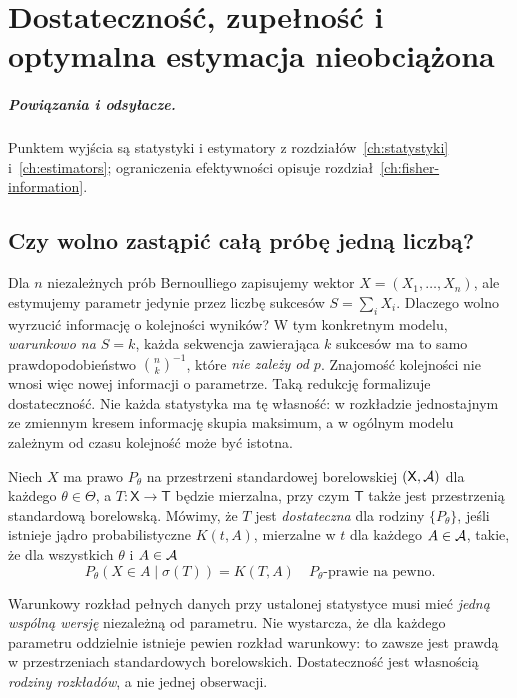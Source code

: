 \chapter{Dostateczność, zupełność i optymalna estymacja nieobciążona}
\label{ch:sufficiency}
\paragraph{Powiązania i odsyłacze.} Punktem wyjścia są statystyki i estymatory z rozdziałów~\ref{ch:statystyki} i~\ref{ch:estimators}; ograniczenia efektywności opisuje rozdział~\ref{ch:fisher-information}.


\section{Czy wolno zastąpić całą próbę jedną liczbą?}
Dla $n$ niezależnych prób Bernoulliego zapisujemy wektor
$X=(X_1,\ldots,X_n)$, ale estymujemy parametr jedynie przez
liczbę sukcesów $S=\sum_i X_i$. Dlaczego wolno wyrzucić
informację o kolejności wyników? W tym konkretnym modelu,
\emph{warunkowo na $S=k$}, każda sekwencja zawierająca $k$
sukcesów ma to samo prawdopodobieństwo $\binom nk^{-1}$,
które \emph{nie zależy od $p$}. Znajomość kolejności nie wnosi
więc nowej informacji o parametrze. Taką redukcję formalizuje
dostateczność. Nie każda statystyka ma tę własność: w rozkładzie
jednostajnym ze zmiennym kresem informację skupia maksimum,
a w ogólnym modelu zależnym od czasu kolejność może być istotna.

\begin{definicja}\label{def:sufficiency}
Niech $X$ ma prawo $P_\theta$ na przestrzeni standardowej borelowskiej
$(\mathsf X,\mathcal A)$ dla każdego $\theta\in\Theta$,
a $T:\mathsf X\to\mathsf T$ będzie mierzalna, przy czym
$\mathsf T$ także jest przestrzenią standardową borelowską.
Mówimy, że $T$ jest \emph{dostateczna} dla rodziny
$\{P_\theta\}$, jeśli istnieje jądro probabilistyczne
$K(t,A)$, mierzalne w $t$ dla każdego $A\in\mathcal A$,
takie, że dla wszystkich $\theta$ i $A\in\mathcal A$
\[
P_\theta(X\in A\mid\sigma(T))=K(T,A)
\quad P_\theta\text{-prawie na pewno}.
\]
\end{definicja}

Warunkowy rozkład pełnych danych przy ustalonej statystyce musi mieć
\emph{jedną wspólną wersję} niezależną od parametru. Nie wystarcza,
że dla każdego parametru oddzielnie istnieje pewien rozkład
warunkowy: to zawsze jest prawdą w przestrzeniach standardowych
borelowskich. Dostateczność jest własnością \emph{rodziny rozkładów},
a nie jednej obserwacji.

